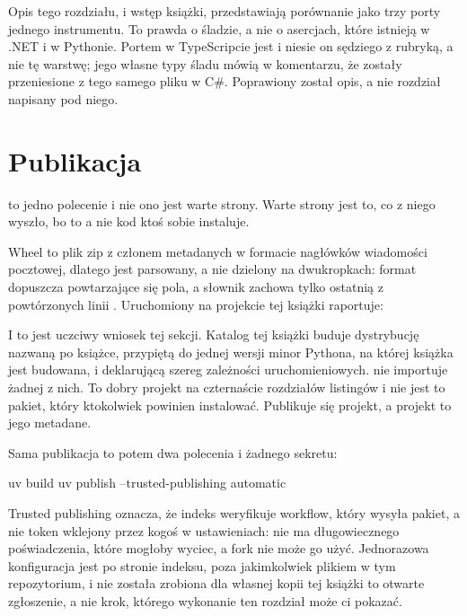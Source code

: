 \begin{note}
Opis tego rozdziału, i wstęp książki, przedstawiają porównanie jako trzy
porty jednego instrumentu. To prawda o śladzie, a nie o asercjach, które
istnieją w .NET i w Pythonie. Portem w TypeScripcie jest
 i niesie on sędziego z rubryką, a nie tę warstwę; jego
własne typy śladu mówią w komentarzu, że zostały przeniesione z tego samego
pliku w C\#. Poprawiony został opis, a nie rozdział napisany pod niego.
\end{note}

\section{Publikacja}
\label{sec:ch14-publish}

 to jedno polecenie i nie ono jest warte strony. Warte
strony jest to, co z niego wyszło, bo to \dash{} a nie kod \dash{} ktoś
sobie instaluje.


\noindent
Wheel to plik zip z członem metadanych w formacie nagłówków wiadomości
pocztowej, dlatego jest parsowany, a nie dzielony na dwukropkach: format
dopuszcza powtarzające się pola, a słownik zachowa tylko ostatnią z
powtórzonych linii . Uruchomiony na projekcie tej
książki raportuje:


\noindent
I to jest uczciwy wniosek tej sekcji. Katalog  tej książki
buduje dystrybucję nazwaną po książce, przypiętą do jednej wersji minor
Pythona, na której książka jest budowana, i deklarującą szereg
zależności uruchomieniowych.
 nie importuje żadnej z nich. To dobry projekt na
czternaście rozdziałów listingów i nie jest to pakiet, który ktokolwiek
powinien instalować. Publikuje się projekt, a projekt to jego metadane.

Sama publikacja to potem dwa polecenia i żadnego sekretu:

\begin{shellcmd}
uv build
uv publish --trusted-publishing automatic
\end{shellcmd}

\noindent
Trusted publishing oznacza, że indeks weryfikuje workflow, który wysyła
pakiet, a nie token wklejony przez kogoś w ustawieniach: nie ma
długowiecznego poświadczenia, które mogłoby wyciec, a fork nie może go
użyć. Jednorazowa konfiguracja jest po stronie indeksu, poza jakimkolwiek
plikiem w tym repozytorium, i nie została zrobiona dla własnej kopii tej
książki \dash{} to otwarte zgłoszenie, a nie krok, którego wykonanie ten
rozdział może ci pokazać.

